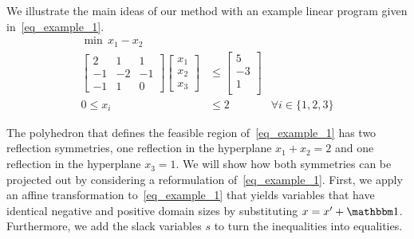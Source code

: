 \documentclass[pdflatex,sn-mathphys-num]{sn-jnl}%
\theoremstyle{thmstyleone}%
\theoremstyle{thmstylethree}%
\theoremstyle{thmstyletwo}%
\begin{document}
We illustrate the main ideas of our method with an example linear program given in~\eqref{eq_example_1}.
\begin{subequations}
\label{eq_example_1}
\begin{align}
    \min\,  x_1 - x_2 & & \\
    \begin{bmatrix}
        2 & 1 & 1 \\
        -1 & -2 & -1 \\
        -1 & 1 & 0
    \end{bmatrix}
    \begin{bmatrix}
        x_1\\
        x_2\\
        x_3
    \end{bmatrix}
    &\leq \begin{bmatrix}
    5\\
    -3\\
    1\\
\end{bmatrix}\\
0 \leq x_i &\leq 2 & \forall i\in \{1,2,3\}
\end{align}    
\end{subequations}

The polyhedron that defines the feasible region of~\eqref{eq_example_1} has two reflection symmetries, one reflection in the hyperplane $x_1 + x_2 = 2$ and one reflection in the hyperplane $x_3 = 1$. We will show how both symmetries can be projected out by considering a reformulation of~\eqref{eq_example_1}.
First, we apply an affine transformation to~\eqref{eq_example_1} that yields variables that have identical negative and positive domain sizes by substituting $x = x' + \onevec$. Furthermore, we add the slack variables $s$ to turn the inequalities into equalities.
\end{document}

